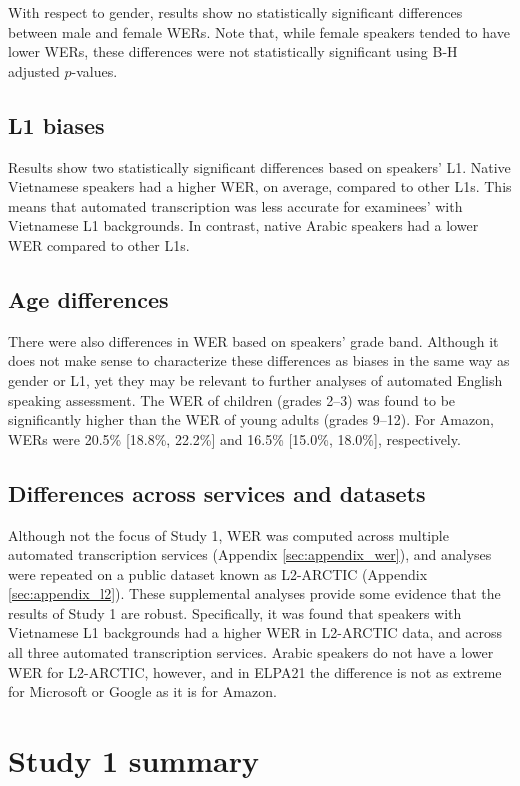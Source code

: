 \documentclass [PhD] {uclathes}
\begin{document}
With respect to gender, results show no statistically significant differences between male and female WERs. Note that, while female speakers tended to have lower WERs, these differences were not statistically significant using B-H adjusted $p$-values.

\subsection{L1 biases}

Results show two statistically significant differences based on speakers’ L1. Native Vietnamese speakers had a higher WER, on average, compared to other L1s. This means that automated transcription was less accurate for examinees’ with Vietnamese L1 backgrounds. In contrast, native Arabic speakers had a lower WER compared to other L1s. 

\subsection{Age differences}

There were also differences in WER based on speakers’ grade band. Although it does not make sense to characterize these differences as biases in the same way as gender or L1, yet they may be relevant to further analyses of automated English speaking assessment. The WER of children (grades 2–3) was found to be significantly higher than the WER of young adults (grades 9–12). For Amazon, WERs were 20.5\% [18.8\%, 22.2\%] and 16.5\% [15.0\%, 18.0\%], respectively.

\subsection{Differences across services and datasets}

Although not the focus of Study 1, WER was computed across multiple automated transcription services (Appendix \ref{sec:appendix_wer}), and analyses were repeated on a public dataset known as L2-ARCTIC (Appendix \ref{sec:appendix_l2}). These supplemental analyses provide some evidence that the results of Study 1 are robust. Specifically, it was found that speakers with Vietnamese L1 backgrounds had a higher WER in L2-ARCTIC data, and across all three automated transcription services. Arabic speakers do not have a lower WER for L2-ARCTIC, however, and in ELPA21 the difference is not as extreme for Microsoft or Google as it is for Amazon. 

\section{Study 1 summary}
\end{document}
